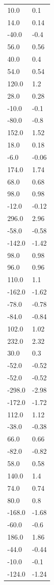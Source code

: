 \begin{longtable}{ll}
10.0 & 0.1 \\
14.0 & 0.14 \\
-40.0 & -0.4 \\
56.0 & 0.56 \\
40.0 & 0.4 \\
54.0 & 0.54 \\
120.0 & 1.2 \\
28.0 & 0.28 \\
-10.0 & -0.1 \\
-80.0 & -0.8 \\
152.0 & 1.52 \\
18.0 & 0.18 \\
-6.0 & -0.06 \\
174.0 & 1.74 \\
68.0 & 0.68 \\
98.0 & 0.98 \\
-12.0 & -0.12 \\
296.0 & 2.96 \\
-58.0 & -0.58 \\
-142.0 & -1.42 \\
98.0 & 0.98 \\
96.0 & 0.96 \\
110.0 & 1.1 \\
-162.0 & -1.62 \\
-78.0 & -0.78 \\
-84.0 & -0.84 \\
102.0 & 1.02 \\
232.0 & 2.32 \\
30.0 & 0.3 \\
-52.0 & -0.52 \\
-52.0 & -0.52 \\
-298.0 & -2.98 \\
-172.0 & -1.72 \\
112.0 & 1.12 \\
-38.0 & -0.38 \\
66.0 & 0.66 \\
-82.0 & -0.82 \\
58.0 & 0.58 \\
140.0 & 1.4 \\
74.0 & 0.74 \\
80.0 & 0.8 \\
-168.0 & -1.68 \\
-60.0 & -0.6 \\
186.0 & 1.86 \\
-44.0 & -0.44 \\
-10.0 & -0.1 \\
-124.0 & -1.24 \\

\end{longtable}
